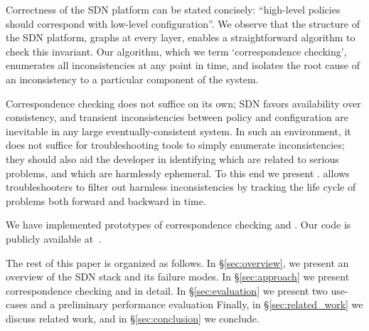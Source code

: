 Correctness of the SDN platform can be stated concisely: ``high-level policies
should correspond with low-level configuration''. We observe that the structure
of the SDN platform, graphs at every layer, enables a straightforward
algorithm to check this invariant. Our algorithm, which we term
`correspondence checking',
enumerates all inconsistencies at any point in time, and isolates the
root cause of an inconsistency to a particular component of the system.

Correspondence checking does not suffice on its own; SDN
favors availability over consistency, and transient inconsistencies between
policy and configuration are inevitable in any large eventually-consistent
system.
In such an environment, it does not suffice for troubleshooting tools to
simply enumerate inconsistencies; they should also aid the developer
in identifying which are related to serious problems, and which are
harmlessly ephemeral. To this end we present \simulator.
\Simulator{} allows troubleshooters 
to filter out harmless inconsistencies by tracking the life cycle of problems 
both forward and backward in time.

We have implemented prototypes
of correspondence checking and \simulator{}. Our code is publicly available
at~\cite{github}.

The rest of this paper is organized as follows. In \S\ref{sec:overview},
we present an overview of the SDN stack and its failure modes.
In \S\ref{sec:approach} we present correspondence checking and
\simulator{} in detail. In \S\ref{sec:evaluation} we present
two use-cases and a preliminary performance evaluation
Finally, in \S\ref{sec:related_work} we discuss related work,
and in \S\ref{sec:conclusion} we conclude.

